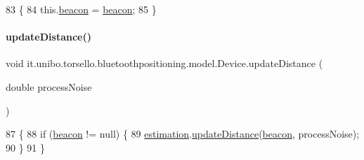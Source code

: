 \begin{DoxyCode}
83                                          \{
84         this.\hyperlink{classit_1_1unibo_1_1torsello_1_1bluetoothpositioning_1_1model_1_1Device_ad5ffce680eb2eb38fc6bb8aee234f155_ad5ffce680eb2eb38fc6bb8aee234f155}{beacon} = \hyperlink{classit_1_1unibo_1_1torsello_1_1bluetoothpositioning_1_1model_1_1Device_ad5ffce680eb2eb38fc6bb8aee234f155_ad5ffce680eb2eb38fc6bb8aee234f155}{beacon};
85     \}
\end{DoxyCode}
\hypertarget{classit_1_1unibo_1_1torsello_1_1bluetoothpositioning_1_1model_1_1Device_af6e2efc8c50b88d07cc651db1f4bbb34_af6e2efc8c50b88d07cc651db1f4bbb34}{}\label{classit_1_1unibo_1_1torsello_1_1bluetoothpositioning_1_1model_1_1Device_af6e2efc8c50b88d07cc651db1f4bbb34_af6e2efc8c50b88d07cc651db1f4bbb34} 
\paragraph{\texorpdfstring{update\+Distance()}{updateDistance()}}
{\footnotesize\ttfamily void it.\+unibo.\+torsello.\+bluetoothpositioning.\+model.\+Device.\+update\+Distance (\begin{DoxyParamCaption}\item[{double}]{process\+Noise }\end{DoxyParamCaption})}


\begin{DoxyCode}
87                                                     \{
88         \textcolor{keywordflow}{if} (\hyperlink{classit_1_1unibo_1_1torsello_1_1bluetoothpositioning_1_1model_1_1Device_ad5ffce680eb2eb38fc6bb8aee234f155_ad5ffce680eb2eb38fc6bb8aee234f155}{beacon} != null) \{
89             \hyperlink{classit_1_1unibo_1_1torsello_1_1bluetoothpositioning_1_1model_1_1Device_ac619c42728cd40f41a5f12fde56b4425_ac619c42728cd40f41a5f12fde56b4425}{estimation}.\hyperlink{classit_1_1unibo_1_1torsello_1_1bluetoothpositioning_1_1distanceEstimation_1_1Estimation_aaf86439861db7facf3f5338ec2fc6cde_aaf86439861db7facf3f5338ec2fc6cde}{updateDistance}(\hyperlink{classit_1_1unibo_1_1torsello_1_1bluetoothpositioning_1_1model_1_1Device_ad5ffce680eb2eb38fc6bb8aee234f155_ad5ffce680eb2eb38fc6bb8aee234f155}{beacon}, processNoise);
90         \}
91     \}
\end{DoxyCode}


